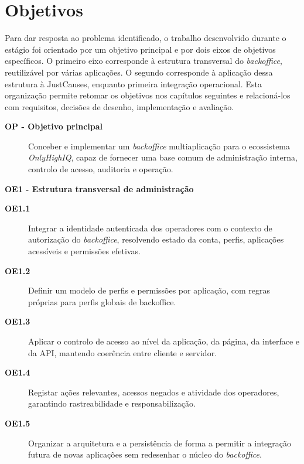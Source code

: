 \section{Objetivos}

Para dar resposta ao problema identificado, o trabalho desenvolvido durante o estágio foi orientado por um objetivo principal e por dois eixos de objetivos específicos. O primeiro eixo corresponde à estrutura transversal do \textit{backoffice}, reutilizável por várias aplicações. O segundo corresponde à aplicação dessa estrutura à JustCauses, enquanto primeira integração operacional. Esta organização permite retomar os objetivos nos capítulos seguintes e relacioná-los com requisitos, decisões de desenho, implementação e avaliação.

\begin{description}
    \item[\textbf{OP - Objetivo principal}] Conceber e implementar um \textit{backoffice} multiaplicação para o ecossistema \textit{OnlyHighIQ}, capaz de fornecer uma base comum de administração interna, controlo de acesso, auditoria e operação.
\end{description}

\textbf{OE1 - Estrutura transversal de administração}
\begin{description}
    \item[\textbf{OE1.1}] Integrar a identidade autenticada dos operadores com o contexto de autorização do \textit{backoffice}, resolvendo estado da conta, perfis, aplicações acessíveis e permissões efetivas.
    \item[\textbf{OE1.2}] Definir um modelo de perfis e permissões por aplicação, com regras próprias para perfis globais de backoffice.
    \item[\textbf{OE1.3}] Aplicar o controlo de acesso ao nível da aplicação, da página, da interface e da \gls{API}, mantendo coerência entre cliente e servidor.
    \item[\textbf{OE1.4}] Registar ações relevantes, acessos negados e atividade dos operadores, garantindo rastreabilidade e responsabilização.
    \item[\textbf{OE1.5}] Organizar a arquitetura e a persistência de forma a permitir a integração futura de novas aplicações sem redesenhar o núcleo do \textit{backoffice}.
\end{description}

